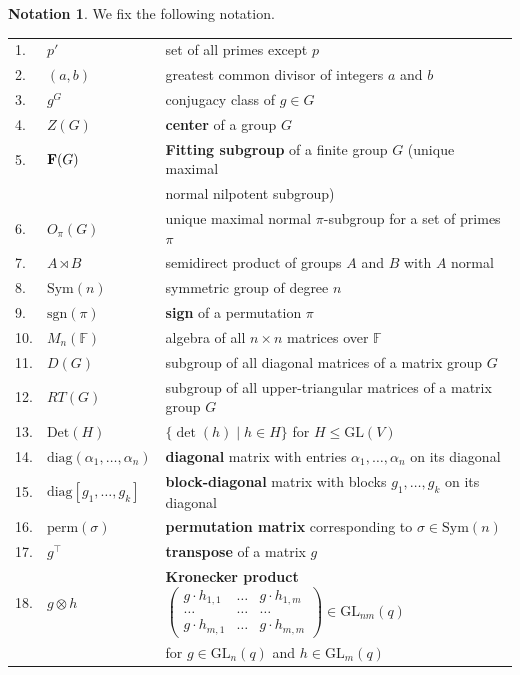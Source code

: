 \documentclass[a4paper,reqno,11pt]{amsart}
\theoremstyle{definition}
\newtheorem{Not}[Th]{Notation}
\theoremstyle{remark}
\numberwithin{equation}{section}
\newcommand{\Sym}{\mathrm{Sym}}
\newcommand{\diag}{\mathrm{diag}}
\newcommand{\sgn}{\mathrm{sgn}}
\newcommand{\per}{\mathrm{perm}}
\newcommand{\Det}{\mathrm{Det}}
\newcommand{\GL}{{\mathrm{GL}}}
\begin{document}
\begin{Not}\label{not} We fix the following notation.
\begin{longtable}{p{1em} p{7em} p{27em} }
1. & $p'$ & set of all primes except $p$\\
2. & $(a,b)$ & greatest common divisor of integers $a$ and $b$\\
3. & $g^G$ & conjugacy class of $g \in G$\\
4. & $Z(G)$ & {\bf center} of a group $G$\\
5. & ${\bf F}(G)$ & {\bf Fitting subgroup} \index{Fitting subgroup} of a finite group $G$ (unique maximal \\ & & normal  nilpotent subgroup)\\
6. & $O_{\pi}(G)$ & unique maximal normal $\pi$-subgroup for a set of primes $\pi$\\
7. & $A \rtimes B$ & semidirect product of groups $A$ and $B$ with $A$ normal\\
8. &  $\Sym(n)$ &  symmetric group of degree $n$ \\
9. & $\sgn(\pi)$ &  {\bf sign} of a permutation $\pi$\\
10. & $M_n(\mathbb{F})$& algebra of all $n \times n$ matrices over $\mathbb{F}$\\
11. & $D(G)$ & subgroup of all diagonal matrices of a matrix group $G$\\
12. & $RT(G)$ & subgroup of all upper-triangular %
 matrices of a matrix group $G$\\
13. & $\Det(H)$ & $\{\det(h) \mid h \in H \}$ for $H \le \GL(V)$\\ 
14. & $\diag(\alpha_1, \ldots, \alpha_n)$ &  {\bf diagonal} matrix with entries $\alpha_1, \ldots, \alpha_n$ on its diagonal  \\  
15. &  $\diag[g_1, \ldots, g_k]$ &  {\bf block-diagonal} matrix with blocks $g_1, \ldots, g_k$ on its diagonal  \\
16. & $\per(\sigma)$ & {\bf permutation matrix} corresponding to $\sigma \in \Sym(n)$\\
17. & $g^{\top}$ & {\bf transpose} of a matrix $g$\\
18. & $g \otimes h$ &  {\bf Kronecker product} \index{Kronecker product}   
 $\begin{pmatrix}
g \cdot h_{1,1}     &  \ldots & g \cdot h_{1,m}  \\
\ldots           &   \ldots   & \ldots   \\
g \cdot h_{m,1}     & \ldots     & g \cdot h_{m,m}      
\end{pmatrix} \in \GL_{nm}(q)$ \\ & & for $g \in \GL_n(q)$ and $h \in \GL_m(q)$ \\
\end{longtable}
\end{Not}
\end{document}
